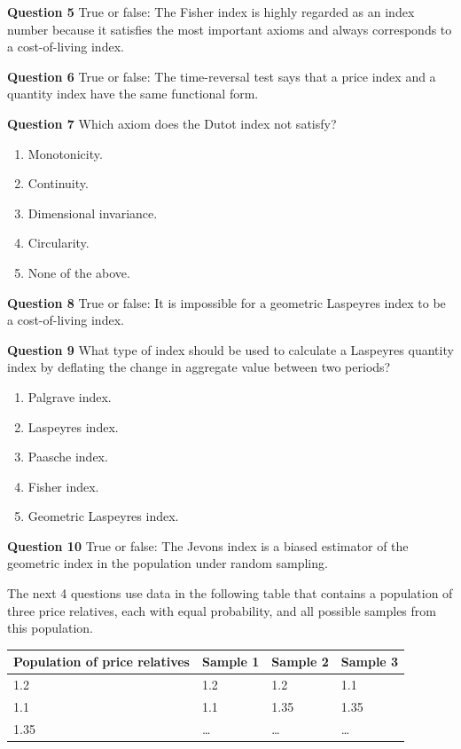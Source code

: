 \documentclass[
]{article}
\begin{document}
\textbf{Question 5} True or false: The Fisher index is highly regarded as an index number because it satisfies the most important axioms and always corresponds to a cost-of-living index.

\textbf{Question 6} True or false: The time-reversal test says that a price index and a quantity index have the same functional form.

\textbf{Question 7} Which axiom does the Dutot index not satisfy?

\begin{enumerate}
\def\labelenumi{\alph{enumi})}
\item
  Monotonicity.
\item
  Continuity.
\item
  Dimensional invariance.
\item
  Circularity.
\item
  None of the above.
\end{enumerate}

\textbf{Question 8} True or false: It is impossible for a geometric Laspeyres index to be a cost-of-living index.

\textbf{Question 9} What type of index should be used to calculate a Laspeyres quantity index by deflating the change in aggregate value between two periods?

\begin{enumerate}
\def\labelenumi{\alph{enumi})}
\item
  Palgrave index.
\item
  Laspeyres index.
\item
  Paasche index.
\item
  Fisher index.
\item
  Geometric Laspeyres index.
\end{enumerate}

\textbf{Question 10} True or false: The Jevons index is a biased estimator of the geometric index in the population under random sampling.

The next 4 questions use data in the following table that contains a population of three price relatives, each with equal probability, and all possible samples from this population.

\begin{longtable}[]{@{}llll@{}}
\toprule
Population of price relatives & Sample 1 & Sample 2 & Sample 3 \\
\midrule
\endhead
1.2 & 1.2 & 1.2 & 1.1 \\
1.1 & 1.1 & 1.35 & 1.35 \\
1.35 & \ldots{} & \ldots{} & \ldots{} \\
\bottomrule
\end{longtable}
\end{document}
